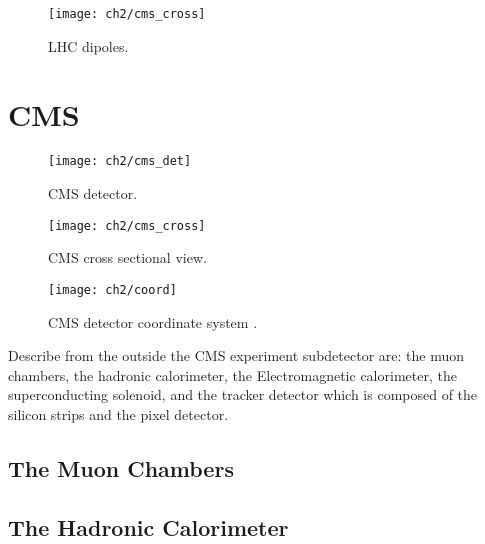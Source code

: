 \begin{figure}[!h]
	\centering
	\texttt{[image: ch2/cms\_cross]}
	\caption[LHC dipoles]{LHC dipoles.}
	\label{fig:cmscross}
\end{figure}


\section{CMS}

\begin{figure}[!h]
	\centering
	\texttt{[image: ch2/cms\_det]}
	\caption[CMS detector]{CMS detector.}
	\label{cms_det}
\end{figure}


\begin{figure}[!h]
	\centering
	\texttt{[image: ch2/cms\_cross]}
	\caption[CMS cross sectional view]{CMS cross sectional view.}
	\label{cmscross}
\end{figure}

\begin{figure}[h!]
  \centering
  \texttt{[image: ch2/coord]}
  \caption[CMS detector coordinate system]{CMS detector coordinate system \cite{and_the}.}
  \label{fig:coord}
\end{figure}



Describe from the outside the CMS experiment subdetector are: the muon chambers, the hadronic calorimeter, the Electromagnetic calorimeter, the superconducting solenoid, and the tracker detector which is composed of the silicon strips and the pixel detector.

\subsection{The Muon Chambers}
\subsection{The Hadronic Calorimeter}

